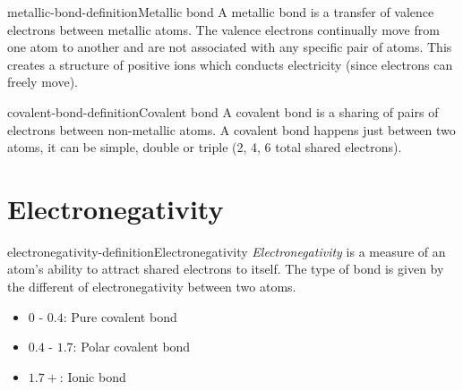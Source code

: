\documentclass[preview]{standalone}
\begin{document}
\begin{snippetdefinition}{metallic-bond-definition}{Metallic bond}
    A metallic bond is a transfer of valence electrons between metallic atoms.
    The valence electrons continually move from one atom to another and are not
    associated with any specific pair of atoms. This creates a structure of positive ions
    which conducts electricity (since electrons can freely move).
\end{snippetdefinition}

\begin{snippetdefinition}{covalent-bond-definition}{Covalent bond}
A covalent bond is a sharing of pairs of electrons between non-metallic atoms.
A covalent bond happens just between two atoms, it can be simple, double or triple (2, 4, 6 total shared electrons).
\end{snippetdefinition}

\section{Electronegativity}

\begin{snippetdefinition}{electronegativity-definition}{Electronegativity}
    \textit{Electronegativity} is a measure of an atom's ability to attract shared electrons to itself.
    The type of bond is given by the different of electronegativity between two atoms.
    \begin{itemize}
        \item \(0\) - \(0.4\): Pure covalent bond
        \item \(0.4\) - \(1.7\): Polar covalent bond
        \item \(1.7+\): Ionic bond
    \end{itemize}
\end{snippetdefinition}
\end{document}
